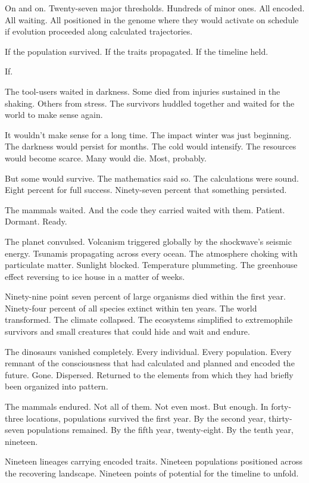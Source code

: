 On and on. Twenty-seven major thresholds. Hundreds of minor ones. All encoded. All waiting. All positioned in the genome where they would activate on schedule if evolution proceeded along calculated trajectories.

If the population survived. If the traits propagated. If the timeline held.

If.

The tool-users waited in darkness. Some died from injuries sustained in the shaking. Others from stress. The survivors huddled together and waited for the world to make sense again.

It wouldn't make sense for a long time. The impact winter was just beginning. The darkness would persist for months. The cold would intensify. The resources would become scarce. Many would die. Most, probably.

But some would survive. The mathematics said so. The calculations were sound. Eight percent for full success. Ninety-seven percent that something persisted.

The mammals waited. And the code they carried waited with them. Patient. Dormant. Ready.

\scenebreak

The planet convulsed. Volcanism triggered globally by the shockwave's seismic energy. Tsunamis propagating across every ocean. The atmosphere choking with particulate matter. Sunlight blocked. Temperature plummeting. The greenhouse effect reversing to ice house in a matter of weeks.

Ninety-nine point seven percent of large organisms died within the first year. Ninety-four percent of all species extinct within ten years. The world transformed. The climate collapsed. The ecosystems simplified to extremophile survivors and small creatures that could hide and wait and endure.

The dinosaurs vanished completely. Every individual. Every population. Every remnant of the consciousness that had calculated and planned and encoded the future. Gone. Dispersed. Returned to the elements from which they had briefly been organized into pattern.

The mammals endured. Not all of them. Not even most. But enough. In forty-three locations, populations survived the first year. By the second year, thirty-seven populations remained. By the fifth year, twenty-eight. By the tenth year, nineteen.

Nineteen lineages carrying encoded traits. Nineteen populations positioned across the recovering landscape. Nineteen points of potential for the timeline to unfold.

